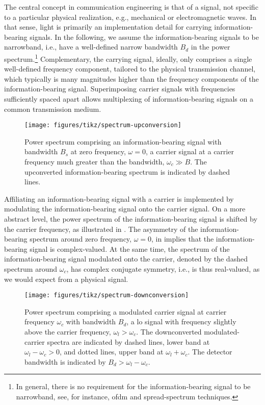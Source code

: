 The central concept in communication engineering is that of a signal, not specific to a particular physical realization, e.g., mechanical or electromagnetic waves.
In that sense, light is primarily an implementation detail for carrying information-bearing signals.
In the following, we assume the information-bearing signals to be narrowband, i.e., have a well-defined narrow bandwidth $B_d$ in the power spectrum.\footnote{In general, there is no requirement for the information-bearing signal to be narrowband, see, for instance, \gls{ofdm} and spread-spectrum techniques.}
Complementary, the carrying signal, ideally, only comprises a single well-defined frequency component, tailored to the physical transmission channel, which typically is many magnitudes higher than the frequency components of the information-bearing signal.
Superimposing carrier signals with frequencies sufficiently spaced apart allows multiplexing of information-bearing signals on a common transmission medium.
\begin{figure}[ht]
	\centering
	\texttt{[image: figures/tikz/spectrum-upconversion]}
	\caption{Power spectrum comprising an information-bearing signal with bandwidth $B_s$ at zero frequency, $\omega=0$, a carrier signal at a carrier frequency much greater than the bandwidth, $\omega_c\gg B$. The upconverted information-bearing spectrum is indicated by dashed lines.}\label{fig:spectrum_upconversion}
\end{figure}
Affiliating an information-bearing signal with a carrier is implemented by modulating the information-bearing signal onto the carrier signal.
On a more abstract level, the power spectrum of the information-bearing signal is shifted by the carrier frequency, as illustrated in .
The asymmetry of the information-bearing spectrum around zero frequency, $\omega=0$, in  implies that the information-bearing signal is complex-valued.
At the same time, the spectrum of the information-bearing signal modulated onto the carrier, denoted by the dashed spectrum around $\omega_c$, has complex conjugate symmetry, i.e., is thus real-valued, as we would expect from a physical signal.
\begin{figure}[ht]
	\centering
	\texttt{[image: figures/tikz/spectrum-downconversion]}
	\caption{Power spectrum comprising a modulated carrier signal at carrier frequency $\omega_c$ with bandwidth $B_d$, a \gls{lo} signal with frequency slightly above the carrier frequency, $\omega_l>\omega_c$. The downconverted modulated-carrier spectra are indicated by dashed lines, lower band at $\omega_l-\omega_c>0$, and dotted lines, upper band at $\omega_l+\omega_c$. The detector bandwidth is indicated by $B_d>\omega_l-\omega_c$.}\label{fig:spectrum_downconversion}
\end{figure}
